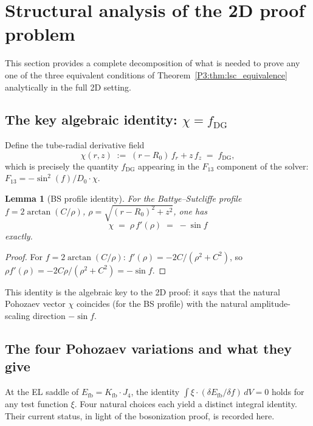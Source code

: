 \documentclass[11pt,a4paper]{article}
\newtheorem{lemma}[theorem]{Lemma}
\theoremstyle{definition}
\theoremstyle{remark}
\begin{document}
\section{Structural analysis of the 2D proof problem}
\label{P3:sec:2d_structure}

This section provides a complete decomposition of what is needed to
prove any one of the three equivalent conditions of
Theorem~\ref{P3:thm:lsc_equivalence} analytically in the full 2D setting.

\subsection{The key algebraic identity: $\chi = f_{\mathrm{DG}}$}

Define the tube-radial derivative field
\begin{equation}
  \chi(r,z) \;:=\; (r-R_0)\,f_r + z\,f_z \;=\; f_{\mathrm{DG}},
  \label{P3:eq:chi_def}
\end{equation}
which is precisely the quantity $f_{\mathrm{DG}}$ appearing in the
$F_{13}$ component of the solver: $F_{13} = -\sin^2(f)/D_0\cdot\chi$.

\begin{lemma}[BS profile identity]
\label{P3:lem:chi_sinf}
For the Battye--Sutcliffe profile $f = 2\arctan(C/\rho)$,
$\rho = \sqrt{(r-R_0)^2+z^2}$, one has
\begin{equation}
  \chi \;=\; \rho\,f'(\rho) \;=\; -\sin f
  \label{P3:eq:chi_sinf}
\end{equation}
exactly.
\end{lemma}

\begin{proof}
For $f=2\arctan(C/\rho)$: $f'(\rho) = -2C/(\rho^2+C^2)$, so
$\rho f'(\rho) = -2C\rho/(\rho^2+C^2) = -\sin f$.
\end{proof}

This identity is the algebraic key to the 2D proof: it says that the
natural Pohozaev vector $\chi$ coincides (for the BS profile) with
the natural amplitude-scaling direction $-\sin f$.

\subsection{The four Pohozaev variations and what they give}

At the EL saddle of $E_{\mathrm{fb}} = K_{\mathrm{fb}}\cdot J_4$,
the identity $\int \xi\cdot(\delta E_{\mathrm{fb}}/\delta f)\,dV = 0$
holds for any test function $\xi$.  Four natural choices each yield
a distinct integral identity.  Their current status, in light of the
bosonization proof, is recorded here.
\end{document}
